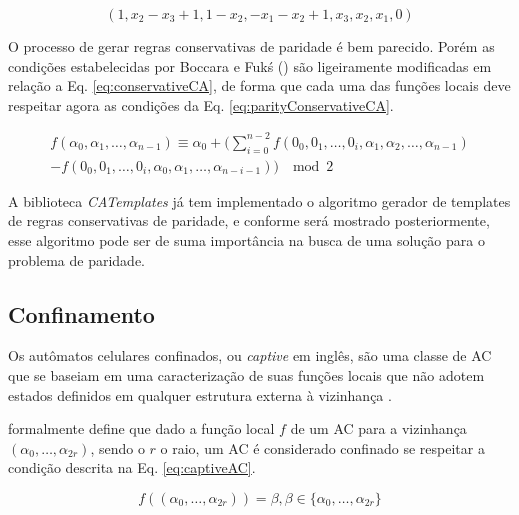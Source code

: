 \begin{equation}
(1,x_2-x_3+1,1-x_2,-x_1-x_2+1,x_3,x_2,x_1,0)
\label{eq:conservativeTemplate}
\end{equation}

O processo de gerar regras conservativas de paridade é bem parecido. Porém as condições estabelecidas por Boccara e Fukś (\citeyear{boccara2002}) são ligeiramente modificadas em relação a Eq. \eqref{eq:conservativeCA}, de forma que cada uma das funções locais deve respeitar agora as condições da Eq. \eqref{eq:parityConservativeCA}.

\begin{equation}
\begin{split}
f(\alpha_0,\alpha_1, \dots,\alpha_{n-1}) \equiv \alpha_0 + (\sum_{i=0}^{n-2}f(0_0,0_1, \dots,0_i,\alpha_1,\alpha_2, \dots,\alpha_{n-1}) \\- f(0_0,0_1, \dots,0_i,\alpha_0,\alpha_1, \dots,\alpha_{n-i-1})) \; \mod 2
\label{eq:parityConservativeCA}
\end{split}
\end{equation}

A biblioteca \textit{CATemplates} já tem implementado o algoritmo gerador de templates de regras conservativas de paridade, e conforme será mostrado posteriormente, esse algoritmo pode ser de suma importância na busca de uma solução para o problema de paridade.





\subsection{Confinamento}
Os autômatos celulares confinados, ou \textit{captive} em inglês, são uma classe de AC que se baseiam em uma caracterização de suas funções locais que não adotem estados definidos em qualquer estrutura externa à vizinhança \cite{theyssier2004captive}. 

 formalmente define que dado a função local $f$ de um AC para a vizinhança $(\alpha_0, \dots, \alpha_{2r})$, sendo o $r$ o raio, um AC é considerado confinado se respeitar a condição descrita na Eq. \eqref{eq:captiveAC}.

\begin{equation}
f((\alpha_0, \dots, \alpha_{2r})) = \beta, \beta \in \{\alpha_0, \dots, \alpha_{2r}\}
\label{eq:captiveAC}
\end{equation}

